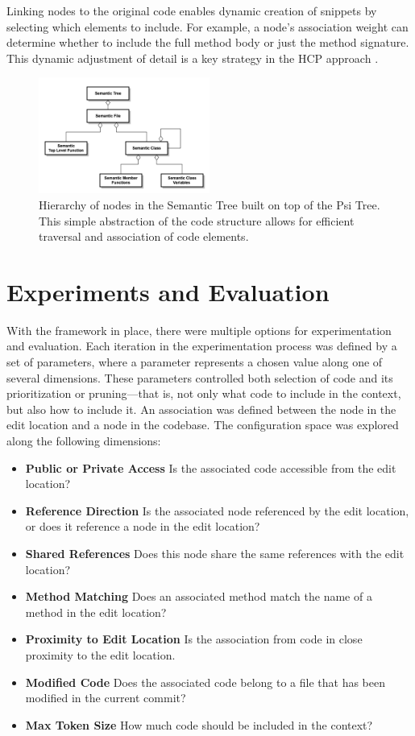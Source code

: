 \documentclass[conference]{IEEEtran}
\begin{document}
Linking nodes to the original code enables dynamic creation of snippets by selecting which elements to include. 
For example, a node's association weight can determine whether to include the full method body or just the method signature. 
This dynamic adjustment of detail is a key strategy in the HCP approach \cite{hcp}.


\begin{figure}[htbp]
\centerline{\includegraphics[width=0.5\textwidth]{SemanticPsiTreeNodeHierarchy.png}}
\caption{Hierarchy of nodes in the Semantic Tree built on top of the Psi Tree. This simple abstraction of the code structure
allows for efficient traversal and association of code elements.}
\label{fig:semantic-tree}
\end{figure}

 
\section{Experiments and Evaluation}

With the framework in place, there were multiple options for experimentation and evaluation. 
Each iteration in the experimentation process was defined by a set of parameters, 
where a parameter represents a chosen value along one of several dimensions.
These parameters controlled both selection of code and its prioritization or pruning—that is, 
not only what code to include in the context, but also how to include it. 
An association was defined between the node in the edit location and a node in the codebase.  
The configuration space was explored along the following dimensions:
\begin{itemize}
\item \textbf{Public or Private Access} Is the associated code accessible from the edit location?
\item \textbf{Reference Direction} Is the associated node referenced by the edit location, or does it reference a node in the edit location?
\item \textbf{Shared References} Does this node share the same references with the edit location?
\item \textbf{Method Matching} Does an associated method match the name of a method in the edit location?
\item \textbf{Proximity to Edit Location} Is the association from code in close proximity to the edit location. 
\item \textbf{Modified Code} Does the associated code belong to a file that has been modified in the current commit?
\item \textbf{Max Token Size} How much code should be included in the context?
\end{itemize}
\end{document}

